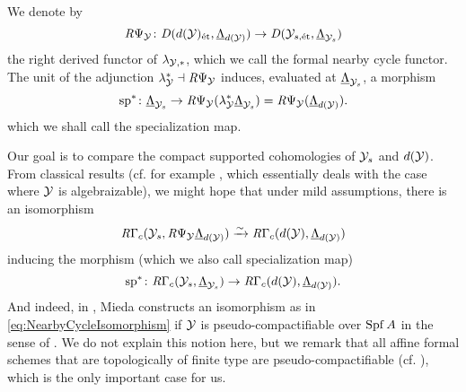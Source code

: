 \documentclass[../main.tex]{subfiles}
\begin{document}
\begin{defi}\label{def:FormalNearbyCycleFunctor}
  We denote by
  \begin{equation*}
    \mathit R \Psi_{\mathcal{Y}}\colon \mathit D (d(\mathcal{Y})_{\textnormal{\'et}}, {\underline \Lambda_{d(\mathcal{Y})}}) \to
    \mathit D (\mathcal{Y}_{s, \textnormal{\'et}},{\underline \Lambda_{\mathcal{Y}_{s}}})
  \end{equation*}
  the right derived functor of $\lambda_{\mathcal{Y},*}$, which we call the formal nearby
  cycle functor. The unit of the adjunction $\lambda_{\mathcal{Y}}^* \dashv 
  \mathit R \Psi_{\mathcal{Y}}$ induces, evaluated at $\underline \Lambda_{\mathcal{Y}_{s}}$, a morphism
  \begin{equation*}
    \mathrm{sp}^* \colon \underline \Lambda_{\mathcal{Y}_{s}} \to 
    \mathit R \Psi_{\mathcal{Y}}( \lambda_{\mathcal{Y}}^* \underline \Lambda_{\mathcal{Y}_{s}}) = 
    \mathit R \Psi_{\mathcal{Y}}(\underline \Lambda_{d(\mathcal{Y})}).
  \end{equation*}
  which we shall call the specialization map.
\end{defi}

Our goal is to compare the compact supported cohomologies of $\mathcal{Y}_s$ and $d(\mathcal{Y})$.
From classical results (cf. for example \cite[Corollary 0.7.9]{huber2013etale}, which
essentially deals with the case where $\mathcal{Y}$ is algebraizable),
we might hope that under mild assumptions, there is an isomorphism
\begin{equation}\label{eq:NearbyCycleIsomorphism}
  \mathit R\Gamma_c(\mathcal{Y}_s, \mathit R\Psi_{\mathcal{Y}} \underline \Lambda_{d(\mathcal{Y})}) \xrightarrow{\sim} \mathit R\Gamma_c
  (d(\mathcal{Y}), \underline \Lambda_{d(\mathcal{Y})})
\end{equation}
inducing the morphism (which we also call specialization map)
\begin{equation*}
  \mathrm{sp}^*\colon \mathit R\Gamma_c(\mathcal{Y}_s, \underline \Lambda_{\mathcal{Y}_s}) \to \mathit R
  \Gamma_c(d(\mathcal{Y}), \underline \Lambda_{d(\mathcal{Y})}).
\end{equation*}
And indeed, in \cite[Corollary 4.29]{mieda2014variants}, Mieda constructs an
isomorphism as in \eqref{eq:NearbyCycleIsomorphism}
if $\mathcal{Y}$ is pseudo-compactifiable over $\operatorname{Spf} A$ in the sense of \cite[Definition
4.24]{mieda2014variants}. We do not explain this notion here, but we remark that
all affine formal schemes that are topologically of finite type are
pseudo-compactifiable (cf. \cite[Example 4.25]{mieda2014variants}), which is
the only important case for us.
\end{document}
